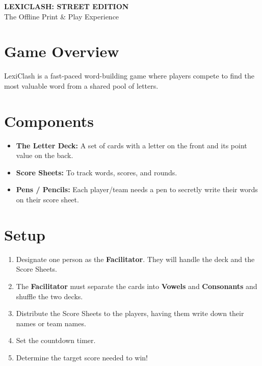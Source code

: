 \documentclass[a4paper,12pt]{article}
\begin{document}
	{\small
		
		\thispagestyle{empty}
		\begin{center}
			{\Huge \textsf{\textbf{LEXICLASH: STREET EDITION}}} \\[0.3cm]
			{\Large \textsf{The Offline Print \& Play Experience}} \\[1cm]
		\end{center}
		
		\section*{Game Overview}
		LexiClash is a fast-paced word-building game where players compete to find the most valuable word from a shared pool of letters.
		
		\section*{Components}
		\begin{itemize}
			\item \textbf{The Letter Deck:} A set of cards with a letter on the front and its point value on the back.
			\item \textbf{Score Sheets:} To track words, scores, and rounds.
			\item \textbf{Pens / Pencils:} Each player/team needs a pen to secretly write their words on their score sheet.
		\end{itemize}
		
		\section*{Setup}
		\begin{enumerate}
			\item Designate one person as the \textbf{Facilitator}. They will handle the deck and the Score Sheets.
			\item The \textbf{Facilitator} must separate the cards into \textbf{Vowels} and \textbf{Consonants} and shuffle the two decks.
			\item Distribute the Score Sheets to the players, having them write down their names or team names.
			\item Set the countdown timer.
			\item Determine the target score needed to win!
		\end{enumerate}
		
}
\end{document}
